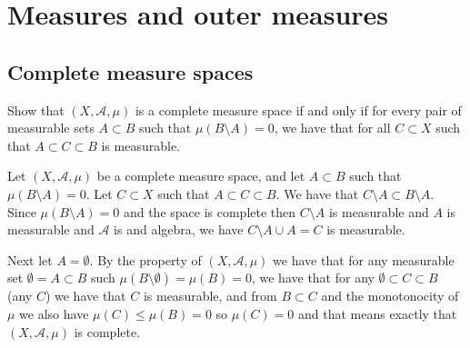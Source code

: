 \documentclass[11pt, a4paper]{article}
\newcommand{\A}{\mathcal A}
\begin{document}
\section{Measures and outer measures}
\subsection{Complete measure spaces}
\begin{exercise}
  Show that $(X,\A,\mu)$ is a complete measure space if and only if
  for every pair of measurable sets $A \subset B$ such that
  $\mu(B \setminus A) = 0$, we have that for all $C \subset X$ such
  that $A \subset C \subset B$ is measurable.
\end{exercise}
\begin{solution}
  Let $(X,\A,\mu)$ be a complete measure space, and let $A \subset B$
  such that $\mu(B \setminus A) = 0$.
  Let $C \subset X$ such that $A \subset C \subset B$.
  We have that $C \setminus A \subset B \setminus A$.
  Since $\mu(B \setminus A) = 0$ and the space is complete then
  $C \setminus A$ is measurable and $A$ is measurable and $\A$ is
  and algebra, we have $C \setminus A \cup A = C$ is measurable.

  Next let $A  = \emptyset$.
  By the property of $(X,\A,\mu)$ we have that for any measurable set
  $\emptyset = A \subset B$ such $\mu(B \setminus \emptyset) = \mu(B) = 0$,
  we have that for any $\emptyset \subset C \subset B$ (any $C$) we have
  that $C$ is measurable, and from $B \subset C$ and the monotonocity
  of $\mu$ we also have $\mu(C) \le \mu(B) = 0$ so $\mu(C) = 0$
  and that means exactly that $(X,\A,\mu)$ is complete.
\end{solution}
\end{document}
